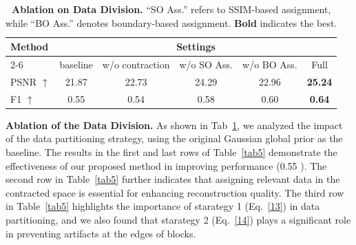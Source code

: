 \begin{table}[h]
    \small
    \centering
    \caption{\textbf{Ablation on Data Division.} “SO Ass.” refers to SSIM-based assignment, while “BO Ass.” denotes boundary-based assignment. \textbf{Bold} indicates the best.}
    \label{tab4}
    \renewcommand{\arraystretch}{0.9}
    \setlength{\tabcolsep}{6pt}
    \begin{tabular}{lccccc}
    \toprule[1pt]
    \multirow{2}{*}{\textbf{Method}} & \multicolumn{5}{c}{\textbf{Settings}} \\
    \cmidrule{2-6}
     & baseline & w/o contraction & w/o SO Ass. & w/o BO Ass. & Full \\
    \midrule[0.8pt]
    PSNR $\uparrow$ & 21.87 & 22.73 & 24.29 & 22.96 & \textbf{25.24} \\
    F1 $\uparrow$    & 0.55  & 0.54  & 0.58  & 0.60  & \textbf{0.64} \\
    \bottomrule[1pt]
    \end{tabular}
    \label{tab4}
\end{table}








\noindent\textbf{Ablation of the Data Division.}
As shown in Tab~\ref{tab4}, we analyzed the impact of the data partitioning strategy, using the original Gaussian global prior as the baseline. The results in the first and last rows of Table~\ref{tab5} demonstrate the effectiveness of our proposed method in improving performance (0.55 ). The second row in Table~\ref{tab5} further indicates that assigning relevant data in the contracted space is essential for enhancing reconstruction quality. The third row in Table~\ref{tab5} highlights the importance of starategy 1 (Eq.~\ref{13}) in data partitioning, and we also found that starategy 2 (Eq.~\ref{14}) plays a significant role in preventing artifacts at the edges of blocks.


